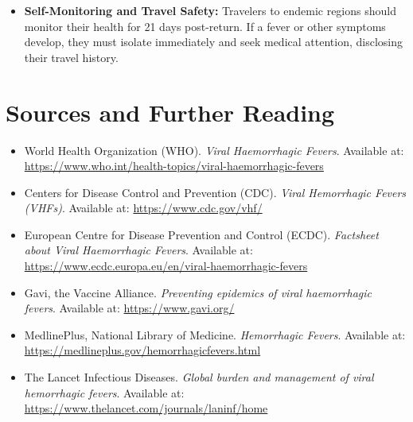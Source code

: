 \begin{itemize}
\begin{itemize}
  \item Immediate isolation of suspected cases in single rooms with dedicated sanitary facilities.
  \item Safe handling, transport, and disposal of laboratory specimens and infectious waste.
  \item Safe and dignified burial protocols for deceased patients, as bodies remain highly infectious.
  \end{itemize}
\item \textbf{Self-Monitoring and Travel Safety:} Travelers to endemic regions should monitor their health for 21 days post-return. If a fever or other symptoms develop, they must isolate immediately and seek medical attention, disclosing their travel history.
\end{itemize}

\section*{Sources and Further Reading}
\begin{itemize}
\item World Health Organization (WHO). \textit{Viral Haemorrhagic Fevers}. Available at: \url{https://www.who.int/health-topics/viral-haemorrhagic-fevers}
\item Centers for Disease Control and Prevention (CDC). \textit{Viral Hemorrhagic Fevers (VHFs)}. Available at: \url{https://www.cdc.gov/vhf/}
\item European Centre for Disease Prevention and Control (ECDC). \textit{Factsheet about Viral Haemorrhagic Fevers}. Available at: \url{https://www.ecdc.europa.eu/en/viral-haemorrhagic-fevers}
\item Gavi, the Vaccine Alliance. \textit{Preventing epidemics of viral haemorrhagic fevers}. Available at: \url{https://www.gavi.org/}
\item MedlinePlus, National Library of Medicine. \textit{Hemorrhagic Fevers}. Available at: \url{https://medlineplus.gov/hemorrhagicfevers.html}
\item The Lancet Infectious Diseases. \textit{Global burden and management of viral hemorrhagic fevers}. Available at: \url{https://www.thelancet.com/journals/laninf/home}
\end{itemize}